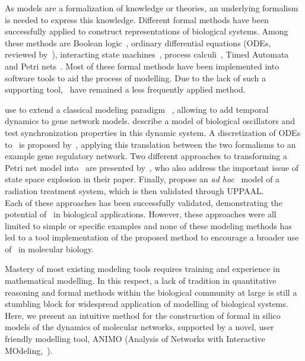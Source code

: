 As models are a formalization of knowledge or theories, an underlying formalism is needed to express
this knowledge. Different formal methods have been successfully applied to construct representations
of biological systems. Among these methods are Boolean logic~\citep{boolean-networks-flower,boolean-networks2},
ordinary differential equations (ODEs, reviewed by~\citealp[]{hidde-review}),
interacting state machines~\citep{interacting-sm1,interacting-sm2},
process calculi~\citep{blenx,bio-pepa}, Timed Automata~\citep{ta-siebert,bartocci-oscillators,
oded-ode-ta-discretization} and Petri nets~\citep{petri-nets,petri-nets2}.
Most of these formal methods have been implemented into software tools to aid the process
of modelling. Due to the lack of such a supporting tool, \tas\ have remained a less 
frequently applied method.

\cite{ta-siebert} use \tas to extend a classical modeling paradigm
~\citep{thomas-formalism}, allowing to add temporal dynamics to gene network models.
\cite{bartocci-oscillators} describe a model of biological oscillators and test 
synchronization properties in this dynamic system.
A discretization of ODEs to \tas\ is proposed by~\citet{oded-ode-ta-discretization}, applying
this translation between the two formalisms to an example gene regulatory network. Two 
different approaches to transforming
a Petri net model into \tas\ are presented by~\citet{ta-giapponesi},
who also address the important issue of state space explosion in their paper.
Finally, \cite{ta-radiazioni} propose an \emph{ad hoc} \tas\ model of a radiation treatment
system, which is then validated through UPPAAL.\\
Each of these approaches has been successfully validated, demonstrating the potential of \tas\
in biological applications. However, these approaches were all limited to simple
or specific examples and none of these modeling methods
has led to a tool implementation of the proposed method to encourage a broader use
of \tas\ in molecular biology.

Mastery of most existing modeling tools requires training and experience in mathematical modelling. 
In this respect, a lack of tradition in quantitative
reasoning and formal methods within the biological community at large is still a stumbling block for
widespread application of modelling of biological systems. Here, we present an intuitive method for the
construction of formal in silico models of the dynamics of molecular networks, supported by a novel,
user friendly modelling tool, ANIMO (Analysis of Networks with Interactive 
MOdeling,~\citealp[]{animo-bibe}).

